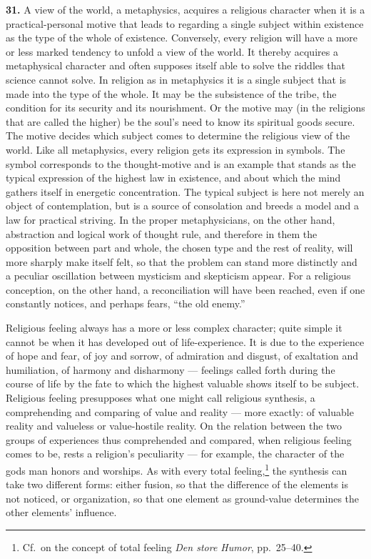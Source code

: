 \documentclass[12pt]{book}
\newcommand{\hnum}[1]{\textbf{#1.}\enspace}
\newcommand{\opage}[1]{\marginnote{\footnotesize\textit{[#1]}}}
\begin{document}
\opage{100}\hnum{31} A view of the world, a metaphysics, acquires a religious character when it is a
practical-personal motive that leads to regarding a single subject within existence as the type of the
whole of existence. Conversely, every religion will have a more or less marked tendency to unfold a view
of the world. It thereby acquires a metaphysical character and often supposes itself able to solve the
riddles that science cannot solve. In religion as in metaphysics it is a single subject that is made into
the type of the whole. It may be the subsistence of the tribe, the condition for its security and its
nourishment. Or the motive may (in the religions that are called the higher) be the soul's need to know
its spiritual goods secure. The motive decides which subject comes to determine the religious view of the
world. Like all metaphysics, every religion gets its expression in symbols. The symbol corresponds to the
thought-motive and is an example that stands as the typical expression of the highest law in existence,
and about which the mind gathers itself in energetic concentration. The typical subject is here not merely
an object of contemplation, but is a source of consolation and breeds a model and a law for practical
striving. In the proper metaphysicians, on the other hand, abstraction and logical work of thought rule,
and therefore in them the opposition between part and whole, the chosen type and \opage{101}the rest of reality, will
more sharply make itself felt, so that the problem can stand more distinctly and a peculiar oscillation
between mysticism and skepticism appear. For a religious conception, on the other hand, a reconciliation
will have been reached, even if one constantly notices, and perhaps fears, ``the old enemy.''

Religious feeling always has a more or less complex character; quite simple it cannot be when it has
developed out of life-experience. It is due to the experience of hope and fear, of joy and sorrow, of
admiration and disgust, of exaltation and humiliation, of harmony and disharmony --- feelings called forth
during the course of life by the fate to which the highest valuable shows itself to be subject. Religious
feeling presupposes what one might call religious synthesis, a comprehending and comparing of value and
reality --- more exactly: of valuable reality and valueless or value-hostile reality. On the relation
between the two groups of experiences thus comprehended and compared, when religious feeling comes to be,
rests a religion's peculiarity --- for example, the character of the gods man honors and worships. As with
every total feeling,\footnote{Cf.\ on the concept of total feeling \textit{Den store Humor}, pp.\ 25--40.}
the synthesis can take two different forms: either fusion, so that the difference of the elements is not
noticed, or organization, so that one element as ground-value determines the other elements' influence.
\end{document}
